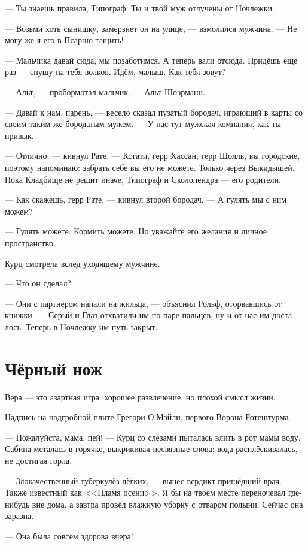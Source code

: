 \documentclass[a4paper,12pt,fleqn]{book}\usepackage{polyglossia}\setdefaultlanguage[babelshorthands=true]{russian}\setotherlanguage{english}\defaultfontfeatures{Ligatures=TeX,Mapping=tex-text}\usepackage{xcolor}\newcommand{\ml}[3]{#2}
\begin{document}
--- Ты знаешь правила, Типограф.
Ты и твой муж отлучены от Ночлежки.

--- Возьми хоть сынишку, замерзнет он на улице, --- взмолился мужчина.
--- Не могу же я его в Псарню тащить!

--- Мальчика давай сюда, мы позаботимся.
А теперь вали отсюда.
Придёшь еще раз --- спущу на тебя волков.
Идём, малыш.
Как тебя зовут?

--- Альт, --- пробормотал мальчик.
\ml{$0$}
{--- Альт Шоэрманн.}
{``Alt Scheuermann.''}

--- Давай к нам, парень, --- весело сказал пузатый бородач, играющий в карты со своим таким же бородатым мужем.
--- У нас тут мужская компания, как ты привык.

--- Отлично, --- кивнул Рате.
--- Кстати, герр Хассан, герр Шолль, вы городские, поэтому напоминаю: забрать себе вы его не можете.
Только через Выкидышей.
Пока Кладбище не решит иначе, Типограф и Сколопендра --- его родители.

--- Как скажешь, герр Рате, --- кивнул второй бородач.
--- А гулять мы с ним можем?

--- Гулять можете.
Кормить можете.
Но уважайте его желания и личное пространство.

Курц смотрела вслед уходящему мужчине.

--- Что он сделал?

--- Они с партнёром напали на жильца, --- объяснил Рольф, оторвавшись от книжки.
--- Серый и Глаз отхватили им по паре пальцев, ну и от нас им досталось.
Теперь в Ночлежку им путь закрыт.

\section{Чёрный нож}

\epigraph
{Вера --- это азартная игра: хорошее развлечение, но плохой смысл жизни.}
{Надпись на надгробной плите Грегори О'Мэйли, первого Ворона Ротештурма.}

--- Пожалуйста, мама, пей! --- Курц со слезами пыталась влить в рот мамы воду.
Сабина металась в горячке, выкрикивая несвязные слова;
вода расплёскивалась, не достигая горла.

--- Злокачественный туберкулёз лёгких, --- вынес вердикт пришёдший врач.
--- Также известный как <<Пламя осени>>.
Я бы на твоём месте переночевал где-нибудь вне дома, а завтра провёл влажную уборку с отваром полыни.
Сейчас она заразна.

--- Она была совсем здорова вчера!
\end{document}
